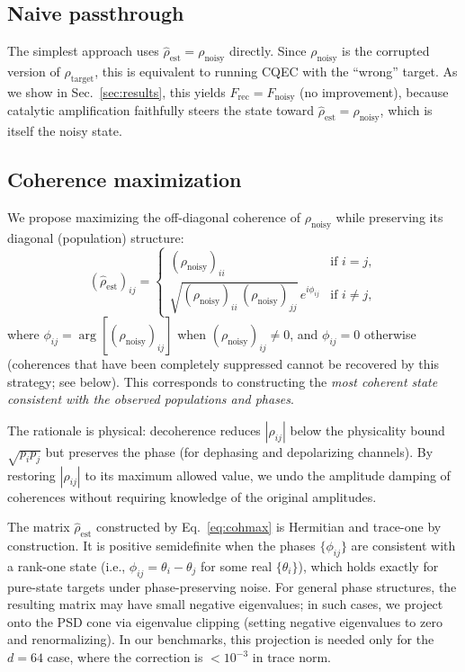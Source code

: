 \documentclass[12pt,a4paper]{article}
\newcommand{\Frec}{F_\mathrm{rec}}
\newcommand{\Fnoisy}{F_\mathrm{noisy}}
\newcommand{\rhot}{\rho_\mathrm{target}}
\newcommand{\rhon}{\rho_\mathrm{noisy}}
\newcommand{\rhoe}{\hat{\rho}_\mathrm{est}}
\begin{document}
\subsection{Naive passthrough}
\label{sec:naive}

The simplest approach uses $\rhoe = \rhon$ directly.
Since $\rhon$ is the corrupted version of $\rhot$, this is equivalent to running CQEC with the ``wrong'' target.
As we show in Sec.~\ref{sec:results}, this yields $\Frec = \Fnoisy$ (no improvement), because catalytic amplification faithfully steers the state toward $\rhoe = \rhon$, which is itself the noisy state.

\subsection{Coherence maximization}
\label{sec:cohmax}

We propose maximizing the off-diagonal coherence of $\rhon$ while preserving its diagonal (population) structure:
\begin{equation}
(\rhoe)_{ij} = \begin{cases}
(\rhon)_{ii} & \text{if } i = j, \\
\sqrt{(\rhon)_{ii}\,(\rhon)_{jj}}\,e^{i\phi_{ij}} & \text{if } i \neq j,
\end{cases}
\label{eq:cohmax}
\end{equation}
where $\phi_{ij} = \arg[(\rhon)_{ij}]$ when $(\rhon)_{ij} \neq 0$, and $\phi_{ij} = 0$ otherwise (coherences that have been completely suppressed cannot be recovered by this strategy; see below).
This corresponds to constructing the \emph{most coherent state consistent with the observed populations and phases}.

The rationale is physical: decoherence reduces $|\rho_{ij}|$ below the physicality bound $\sqrt{p_i p_j}$ but preserves the phase (for dephasing and depolarizing channels).
By restoring $|\rho_{ij}|$ to its maximum allowed value, we undo the amplitude damping of coherences without requiring knowledge of the original amplitudes.

The matrix $\rhoe$ constructed by Eq.~\eqref{eq:cohmax} is Hermitian and trace-one by construction.
It is positive semidefinite when the phases $\{\phi_{ij}\}$ are consistent with a rank-one state (i.e., $\phi_{ij} = \theta_i - \theta_j$ for some real $\{\theta_i\}$), which holds exactly for pure-state targets under phase-preserving noise.
For general phase structures, the resulting matrix may have small negative eigenvalues; in such cases, we project onto the PSD cone via eigenvalue clipping (setting negative eigenvalues to zero and renormalizing).
In our benchmarks, this projection is needed only for the $d = 64$ case, where the correction is $< 10^{-3}$ in trace norm.
\end{document}
